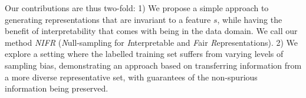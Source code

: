 

Our contributions are thus two-fold: 
%
1) We propose a simple approach to generating representations that are invariant to a feature $s$,
while having the benefit of interpretability that comes with being in the data domain. 
%
We call our method \emph{NIFR} (\emph{N}ull-sampling for \emph{I}nterpretable and \emph{F}air
\emph{R}epresentations).
%
2) We explore a setting where the labelled training set suffers from varying levels of sampling
bias, demonstrating an approach based on transferring information from a more diverse
representative set, with guarantees of the non-spurious information being preserved.
